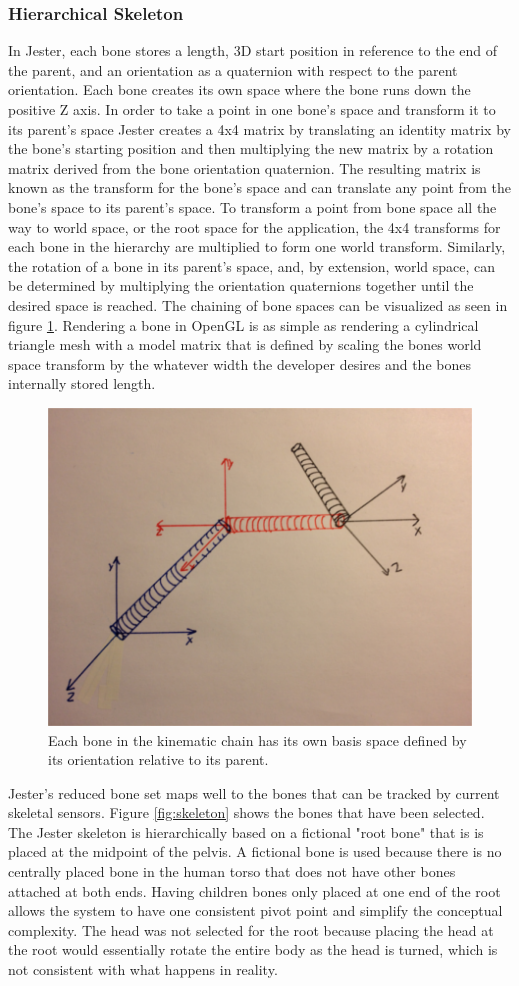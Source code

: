 \subsubsection{Hierarchical Skeleton}\label{sec:bone_hierarchy}

In Jester, each bone stores a length, 3D start position in reference to the end of the parent, and an orientation as a quaternion with respect to the parent orientation. Each bone creates its own space where the bone runs down the positive Z axis. In order to take a point in one bone’s space and transform it to its parent’s space Jester creates a 4x4 matrix by translating an identity matrix by the bone’s starting position and then multiplying the new matrix by a rotation matrix derived from the bone orientation quaternion. The resulting matrix is known as the transform for the bone’s space and can translate any point from the bone’s space to its parent’s space. To transform a point from bone space all the way to world space, or the root space for the application, the 4x4 transforms for each bone in the hierarchy are multiplied to form one world transform. Similarly, the rotation of a bone in its parent’s space, and, by extension, world space, can be determined by multiplying the orientation quaternions together until the desired space is reached. The chaining of bone spaces can be visualized as seen in figure \ref{fig:joint_spaces}. Rendering a bone in OpenGL is as simple as rendering a cylindrical triangle mesh with a model matrix that is defined by scaling the bones world space transform by the whatever width the developer desires and the bones internally stored length.

\begin{figure}[]
\centering
\includegraphics[width=.5\textwidth]{figures/spaceChain}
\caption{Each bone in the kinematic chain has its own basis space defined by its orientation relative to its parent.}
\label{fig:joint_spaces}
\end{figure}

Jester's reduced bone set maps well to the bones that can be tracked by current skeletal sensors. Figure \ref{fig:skeleton} shows the bones that have been selected. The Jester skeleton is hierarchically based on a fictional "root bone" that is is placed at the midpoint of the pelvis. A fictional bone is used because there is no centrally placed bone in the human torso that does not have other bones attached at both ends. Having children bones only placed at one end of the root allows the system to have one consistent pivot point and simplify the conceptual complexity. The head was not selected for the root because placing the head at the root would essentially rotate the entire body as the head is turned, which is not consistent with what happens in reality.

